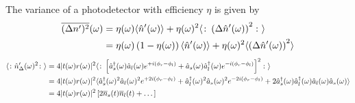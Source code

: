 The variance of a photodetector with efficiency $\eta$ is given by~\cite[p.~194]{Vogel2006}
\begin{equation}
	\begin{split}
		\overline{(\Delta n^\prime)^2}(\omega)
		&=
		\eta(\omega)
		\langle\hat{n}^\prime(\omega)\rangle
		+
		\eta(\omega)^2
		\langle\colon\left(\Delta\hat{n}^\prime(\omega)\right)^2\colon\rangle
		\\
		&=
		\eta(\omega)\left(1-\eta(\omega)\right)
		\langle\hat{n}^\prime(\omega)\rangle
		+
		\eta(\omega)^2
		\langle\left(\Delta\hat{n}^\prime(\omega)\right)^2\rangle
	\end{split}
\end{equation}
\begin{equation}
	\begin{split}
		\langle\colon\hat{n}_\Delta^\prime(\omega)^2\colon\rangle
		&=
		4\lvert t(\omega)r(\omega)\rvert^2
		\langle
			\colon
			\left[
				\hat{a}_s^\dagger(\omega)
				\hat{a}_l(\omega)
				e^{+i(\phi_r-\phi_l)}
				+
				\hat{a}_s(\omega)
				\hat{a}_l^\dagger(\omega)
				e^{-i(\phi_r-\phi_l)}
			\right]^2
			\colon
		\rangle
		\\
		&=
		4\lvert t(\omega)r(\omega)\rvert^2
		\langle
			\hat{a}_s^\dagger(\omega)^2
			\hat{a}_l(\omega)^2
			e^{+2i(\phi_r-\phi_l)}
			+
			\hat{a}_l^\dagger(\omega)^2
			\hat{a}_s(\omega)^2
			e^{-2i(\phi_r-\phi_l)}
			+
			2
			\hat{a}_s^\dagger(\omega)
			\hat{a}_l^\dagger(\omega)
			\hat{a}_l(\omega)
			\hat{a}_s(\omega)
		\rangle
		\\
		&=
		4\lvert t(\omega)r(\omega)\rvert^2
		\left[
			2
			\overline{n}_s(t)
			\overline{n}_l(t)
			+
			\dots
		\right]
	\end{split}
\end{equation}